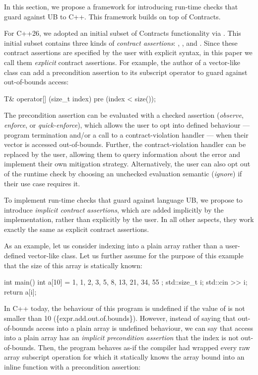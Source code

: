 In this section, we propose a framework for introducing run-time checks that guard against UB to C++. This framework builds on top of Contracts.

For C++26, we adopted an initial subset of Contracts functionality via \cite{P2900R14}. This initial subset contains three kinds of \emph{contract assertions}: , , and . Since these contract assertions are specified by the user with explicit syntax, in this paper we call them \emph{explicit} contract assertions. For example, the author of a vector-like class can add a precondition assertion to its subscript operator to guard against out-of-bounds access:

\begin{codeblock}
T& operator[] (size_t index)
  pre (index < size());
\end{codeblock}

The precondition assertion  can be evaluated with a checked assertion  (\emph{observe}, \emph{enforce}, or \emph{quick-enforce}), which allows the user to opt into defined behaviour --- program termination and/or a call to a contract-violation handler --- when their vector is accessed out-of-bounds. Further, the contract-violation handler can be replaced by the user, allowing them to query information about the error and implement their own mitigation strategy. Alternatively, the user can also opt out of the runtime check by choosing an unchecked evaluation semantic (\emph{ignore}) if their use case requires it. 

To implement run-time checks that guard against language UB, we propose to introduce \emph{implicit contract assertions}, which are added implicitly by the implementation, rather than explicitly by the user. In all other aspects, they work exactly the same as explicit contract assertions.

As an example, let us consider indexing into a plain array rather than a user-defined vector-like class. Let us further assume for the purpose of this example that the size  of this array is statically known:

\begin{codeblock}
int main() {
  int a[10] = { 1, 1, 2, 3, 5, 8, 13, 21, 34, 55 };
  std::size_t i; 
  std::cin >> i;
  return a[i];
}
\end{codeblock}

In C++ today, the behaviour of this program is undefined if the value of  is not smaller than 10 (\{expr.add.out.of.bounds\}). However, instead of saying that out-of-bounds access into a plain array is undefined behaviour, we can say that access into a plain array has an \emph{implicit precondition assertion} that the index is not out-of-bounds. Then, the program behaves as-if the compiler had wrapped every raw array subscript operation for which it statically knows the array bound  into an inline function with a precondition assertion:

